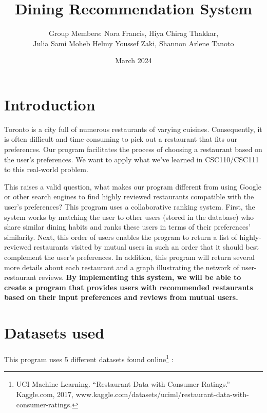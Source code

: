 \documentclass{article}
\title{Dining Recommendation System}
\author{Group Members: Nora Francis, Hiya Chirag Thakkar, \\
Julia Sami Moheb Helmy Youssef Zaki, Shannon Arlene Tanoto}
\date{March 2024}
\begin{document}
\maketitle

\section{Introduction}
Toronto is a city full of numerous restaurants of varying cuisines. Consequently, it is often difficult and time-consuming to pick out a restaurant that fits our preferences. Our program facilitates the process of choosing a restaurant based on the user’s preferences. We want to apply what we’ve learned in CSC110/CSC111 to this real-world problem. 


This raises a valid question, what makes our program different from using Google or other search engines to find highly reviewed restaurants compatible with the user’s preferences? This program uses a collaborative ranking system. First, the system works by matching the user to other users (stored in the database) who share similar dining habits and ranks these users in terms of their preferences’ similarity. Next, this order of users enables the program to return a list of highly-reviewed restaurants visited by mutual users in such an order that it should best complement the user’s preferences. In addition, this program will return several more details about each restaurant and a graph illustrating the network of user-restaurant reviews. \textbf{By implementing this system, we will be able to create a program that provides users with recommended restaurants based on their input preferences and reviews from mutual users.}



\section{Datasets used}
This program uses 5 different datasets found online\footnote{UCI Machine Learning. “Restaurant Data with Consumer Ratings.” Kaggle.com, 2017, www.kaggle.com/datasets/uciml/restaurant-data-with-consumer-ratings.‌} :
\end{document}
